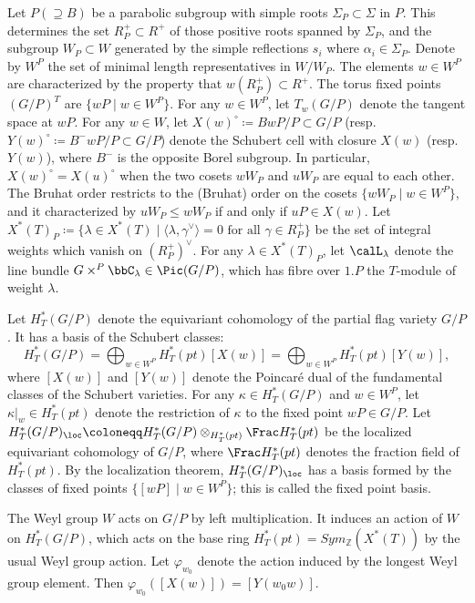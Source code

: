Let $P (\supseteq B)$ be a parabolic subgroup with simple roots $\Sigma_P\subset \Sigma$ in $P$. This determines
the set $R_P^+ \subset R^+$ of those positive roots spanned by $\Sigma_P$, and the subgroup $W_P \subset W$ generated 
by the simple reflections $s_i$ where $\alpha_i \in \Sigma_P$. Denote by $W^P$ the set of 
minimal length representatives in $W/W_P$. The elements $w\in W^P$ are characterized by the property that $w(R^+_P)\subset R^+$. 
The torus fixed points $(G/P)^T$ are $\{wP\mid w\in W^P\}$. For any $w\in W^P$, let 
$T_w(G/P)$ denote the tangent space at $wP$. For any $w\in W$, let $X(w)^\circ\coloneqq BwP/P\subset G/P$ (resp. 
$Y(w)^\circ\coloneqq B^-wP/P\subset G/P$) denote the Schubert cell with closure $X(w)$ (resp. $Y(w)$), where 
$B^-$ is the opposite Borel subgroup. In particular, $X(w)^\circ=X(u)^\circ$ when the two cosets $wW_P$ and 
$uW_P$ are equal to each other. The Bruhat order restricts to the (Bruhat) order
on the cosets 
$\{wW_P\mid w\in W^P\}$, and it characterized by $uW_P\leq wW_P$ if and only if 
$uP\in X(w)$. Let $X^{*}(T)_P\coloneqq \{\lambda\in X^{*}(T)\mid \langle\lambda, \gamma^\vee\rangle=0 \text{ for all }
\gamma\in R^+_P \}$ be the set of integral weights which vanish on $ (R^+_P)^\vee$. For any 
$\lambda\in X^*(T)_P$, let $\calL_\lambda$ denote the line bundle $G\times^P\bbC_\lambda\in\Pic(G/P)$, which has 
fibre over $1.P$ the $T$-module of weight $\lambda$.

Let $H_T^*(G/P)$ denote the equivariant cohomology of the partial flag variety $G/P$. It has a basis of the Schubert classes:
\[H_T^*(G/P)=\bigoplus_{w\in W^P} H_T^*(pt)[X(w)]=\bigoplus_{w\in W^P} H_T^*(pt)[Y(w)],\]
{where $[X(w)]$ and $[Y(w)]$ denote the Poincar{\'e} dual of the fundamental classes of the Schubert varieties.}
For any $\kappa \in H_T^*(G/P)$ and $w\in W^P$, let $\kappa|_w\in H_T^*(pt)$ denote the restriction of $\kappa$ to the fixed point $wP\in G/P$.
Let $H_T^*(G/P)_{\loc} \coloneqq H_T^*(G/P)\otimes_{H_T^*(pt)}\Frac H_T^*(pt)$ be the localized equivariant cohomology of $G/P$, where $\Frac H_T^*(pt)$ denotes the fraction field of $H_T^*(pt)$. 
By the localization theorem,  $H_T^*(G/P)_{\loc}$ has a basis formed by the classes of fixed points $\{[wP]\mid w\in W^P\}$; 
this is called the fixed point basis.  

The Weyl group $W$ acts on $G/P$ by left multiplication. It induces an action of $W$ on $H_T^*(G/P)$, 
which acts on the base ring 
$H_T^*(pt)=Sym_{\mathbb{Z}}(X^*(T))$
by the usual Weyl group action. Let $\varphi_{w_0}$ denote the action induced by 
the longest Weyl group element. Then $\varphi_{w_0}([X(w)])=[Y(w_0w)]$.

